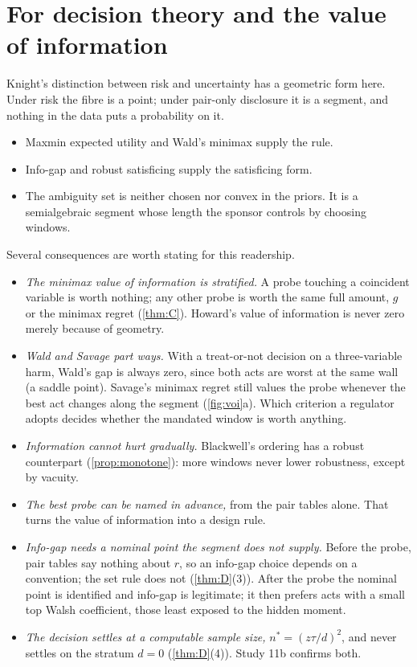 \documentclass[11pt]{article}
\theoremstyle{definition}\newtheorem{definition}{Definition}\newtheorem{remark}{Remark}
\begin{document}
\section{For decision theory and the value of information}\label{sec:voi}
Knight's distinction \cite{Knight1921} between risk and uncertainty has a geometric form here. Under risk the fibre is a point; under
pair-only disclosure it is a segment, and nothing in the data puts a probability on it.
\begin{itemize}
\item Maxmin expected utility \cite{GilboaSchmeidler1989} and Wald's minimax \cite{Wald1950} supply the rule.
\item Info-gap \cite{BenHaim2006} and robust satisficing \cite{SchwartzBenHaimDacso2011,LongSimZhou2023} supply the satisficing form.
\item The ambiguity set is neither chosen nor convex in the priors. It is a semialgebraic segment whose length the sponsor controls by
  choosing windows.
\end{itemize}
Several consequences are worth stating for this readership.
\begin{itemize}
\item \emph{The minimax value of information is stratified.} A probe touching a coincident variable is worth nothing; any other probe
  is worth the same full amount, $g$ or the minimax regret (\cref{thm:C}). Howard's value of information \cite{Howard1966} is never zero
  merely because of geometry.
\item \emph{Wald and Savage part ways.} With a treat-or-not decision on a three-variable harm, Wald's gap is always zero, since both
  acts are worst at the same wall (a saddle point). Savage's minimax regret \cite{Savage1951} still values the probe whenever the best
  act changes along the segment (\cref{fig:voi}a). Which criterion a regulator adopts decides whether the mandated window is worth
  anything.
\item \emph{Information cannot hurt gradually.} Blackwell's ordering \cite{Blackwell1953} has a robust counterpart (\cref{prop:monotone}):
  more windows never lower robustness, except by vacuity.
\item \emph{The best probe can be named in advance,} from the pair tables alone. That turns the value of information into a design
  rule.
\item \emph{Info-gap needs a nominal point the segment does not supply.} Before the probe, pair tables say nothing about $r$, so an
  info-gap choice depends on a convention; the set rule does not (\cref{thm:D}(3)). After the probe the nominal point is identified and
  info-gap is legitimate; it then prefers acts with a small top Walsh coefficient, those least exposed to the hidden moment.
\item \emph{The decision settles at a computable sample size,} $n^*=(z\tau/d)^2$, and never settles on the stratum $d=0$
  (\cref{thm:D}(4)). Study 11b confirms both.
\end{itemize}
\end{document}
